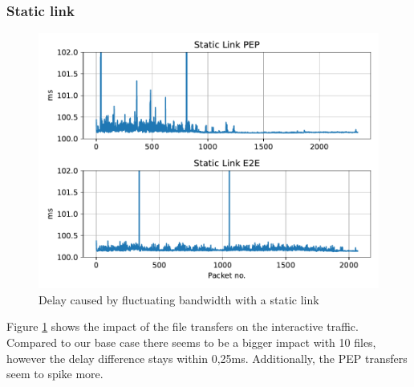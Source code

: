 \documentclass[a4paper,english, 11pt]{report}
\begin{document}
\subsubsection{Static link}

\begin{figure}[h!] %
	\centering
	\includegraphics[scale=0.50]{../diagrams/witestlab/staticlink.pdf}
  	\caption{Delay caused by fluctuating bandwidth with a static link}
  	\label{fig:witestlab_static_delay}
\end{figure}

Figure \ref{fig:witestlab_static_delay} shows the impact of the file transfers on the interactive traffic. Compared to our base case there seems to be a bigger impact with 10 files, however the delay difference stays within 0,25ms. Additionally, the PEP transfers seem to spike more.\\
\end{document}

